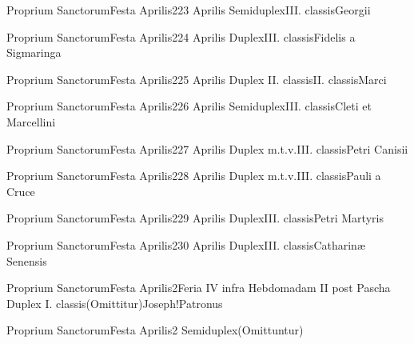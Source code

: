 \documentclass[nocturnale-romanum.tex]{subfiles}
\begin{document}
	{Proprium Sanctorum}{Festa Aprilis}{2}{23 Aprilis}
	{Semiduplex}{III. classis}{Georgii}
	{}
	{}

	{Proprium Sanctorum}{Festa Aprilis}{2}{24 Aprilis}
	{Duplex}{III. classis}{Fidelis a Sigmaringa}
	{}
	{}

	{Proprium Sanctorum}{Festa Aprilis}{2}{25 Aprilis}
	{Duplex II. classis}{II. classis}{Marci}
	{}
	{}

	{Proprium Sanctorum}{Festa Aprilis}{2}{26 Aprilis}
	{Semiduplex}{III. classis}{Cleti et Marcellini}
	{}
	{}

	{Proprium Sanctorum}{Festa Aprilis}{2}{27 Aprilis}
	{Duplex m.t.v.}{III. classis}{Petri Canisii}
	{}
	{}

	{Proprium Sanctorum}{Festa Aprilis}{2}{28 Aprilis}
	{Duplex m.t.v.}{III. classis}{Pauli a Cruce}
	{}
	{}

	{Proprium Sanctorum}{Festa Aprilis}{2}{29 Aprilis}
	{Duplex}{III. classis}{Petri Martyris}
	{}
	{}

	{Proprium Sanctorum}{Festa Aprilis}{2}{30 Aprilis}
	{Duplex}{III. classis}{Catharinæ Senensis}
	{}
	{}

	{Proprium Sanctorum}{Festa Aprilis}{2}{Feria IV infra Hebdomadam II post Pascha}
	{Duplex I. classis}{(Omittitur)}{Joseph!Patronus}
	{}
	{}

	{Proprium Sanctorum}{Festa Aprilis}{2}{}
	{Semiduplex}{(Omittuntur)}{}
	{}
	{}
\end{document}
